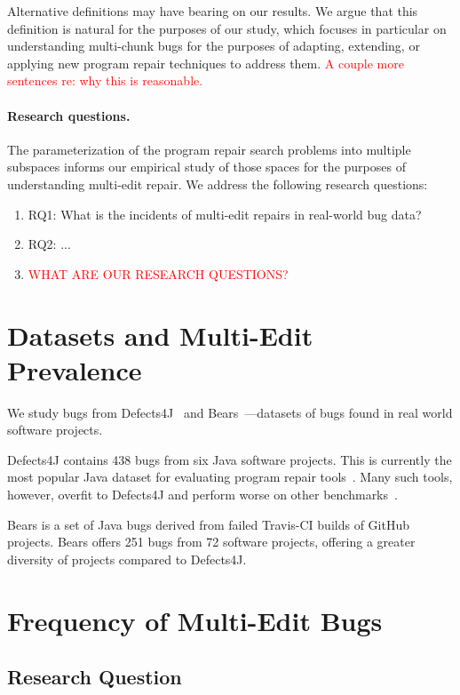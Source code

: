 \documentclass[sigconf, timestamp-false, anonymous=true]{acmart}
\newcommand\todo[1]{\textcolor{red}{#1}}
\begin{document}
Alternative definitions may have bearing on our results.  We argue that this
definition is natural for the purposes of our study, which focuses in particular
on understanding multi-chunk bugs for the purposes of adapting, extending, or
applying new program repair techniques to address them. \todo{A couple more
  sentences re: why this is reasonable.}

\paragraph{Research questions.}  The parameterization of the program repair
search problems into multiple subspaces informs our empirical study of those
spaces for the purposes of understanding multi-edit repair.  We address the
following research questions:

\begin{enumerate}
\item RQ1: What is the incidents of multi-edit repairs in real-world bug data?
\item RQ2: ...
\item \todo{WHAT ARE OUR RESEARCH QUESTIONS?}
\end{enumerate}

\section{Datasets and Multi-Edit Prevalence}
\label{sec:data-rq1}

We study bugs from Defects4J~\cite{defects4j} and Bears~\cite{bears}---datasets of 
bugs found in real world software projects.

Defects4J contains 438 bugs from six Java software projects. This  
is currently the most popular Java dataset for evaluating program repair tools~\cite{durieux-repair-them-all}.
Many such tools, however, overfit to Defects4J and perform worse on other 
benchmarks~\cite{durieux-repair-them-all}. 

Bears is a set of Java bugs derived from failed Travis-CI builds of GitHub projects.
Bears offers 251 bugs from 72 software projects, offering a greater diversity of 
projects compared to Defects4J.

\section{Frequency of Multi-Edit Bugs}

\subsection{Research Question}
\end{document}
